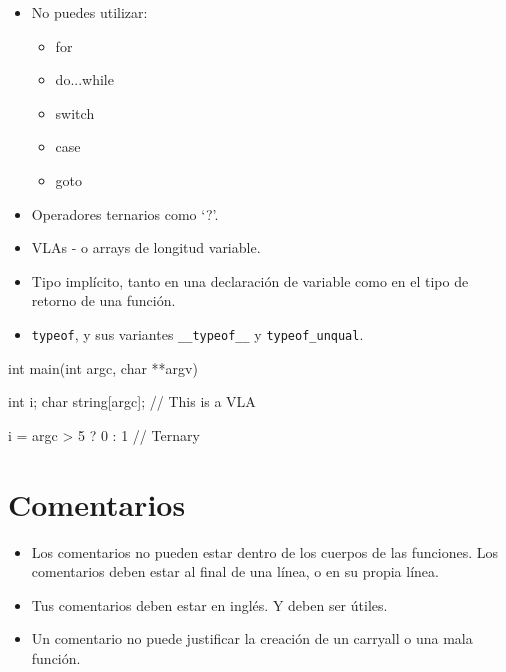 \documentclass{42-es}
\begin{document}
\begin{itemize}
      \item No puedes utilizar:
            \begin{itemize}

                  \item for
                  \item do...while
                  \item switch
                  \item case
                  \item goto

            \end{itemize}
      \item Operadores ternarios como `?'.
      \item VLAs - o arrays de longitud variable.
      \item Tipo implícito, tanto en una declaración de variable como en el tipo
            de retorno de una función.

            \item \texttt{typeof}, y sus variantes \texttt{\_\_typeof\_\_} y
            \texttt{typeof\_unqual}.

\end{itemize}
\begin{42ccode}
      int main(int argc, char **argv)
      {
                  int i;
                  char	string[argc]; // This is a VLA

                  i = argc > 5 ? 0 : 1 // Ternary
            }
\end{42ccode}
\newpage

\section{Comentarios}

\begin{itemize}
      \item Los comentarios no pueden estar dentro de los cuerpos de las
            funciones. Los comentarios deben estar al final de una línea, o en
            su propia
            línea.
      \item Tus comentarios deben estar en inglés. Y deben ser útiles.
      \item Un comentario no puede justificar la creación de un carryall o
            una mala función.
\end{itemize}
\end{document}
